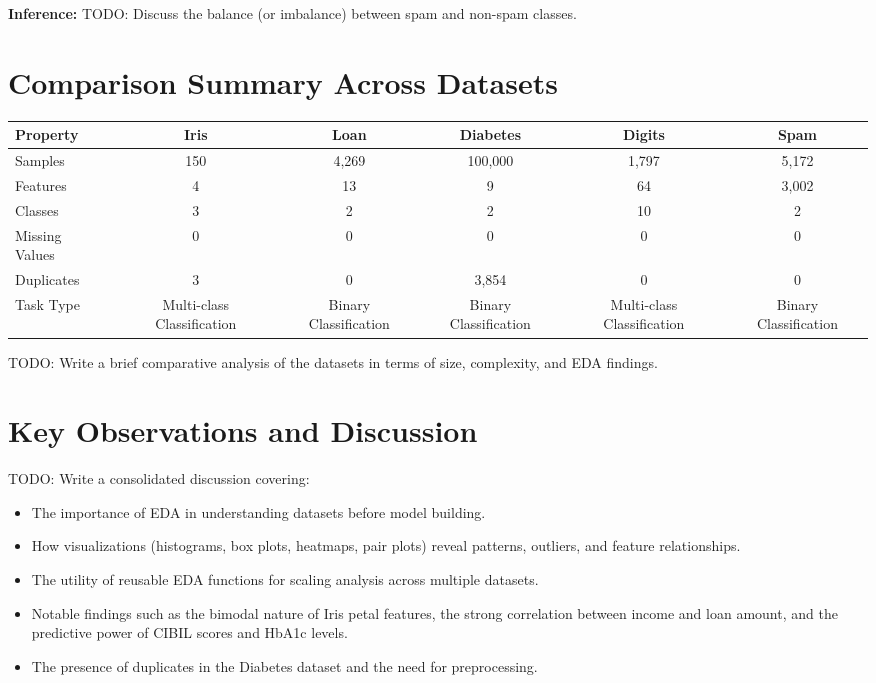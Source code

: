 \documentclass[12pt,a4paper]{article}
\begin{document}
\textbf{Inference:}
TODO: Discuss the balance (or imbalance) between spam and non-spam classes.

\section{Comparison Summary Across Datasets}

\begin{longtable}{|p{3.5cm}|c|c|c|c|c|}
\hline
\textbf{Property} & \textbf{Iris} & \textbf{Loan} & \textbf{Diabetes} & \textbf{Digits} & \textbf{Spam} \\ \hline
Samples & 150 & 4,269 & 100,000 & 1,797 & 5,172 \\ \hline
Features & 4 & 13 & 9 & 64 & 3,002 \\ \hline
Classes & 3 & 2 & 2 & 10 & 2 \\ \hline
Missing Values & 0 & 0 & 0 & 0 & 0 \\ \hline
Duplicates & 3 & 0 & 3,854 & 0 & 0 \\ \hline
Task Type & Multi-class Classification & Binary Classification & Binary Classification & Multi-class Classification & Binary Classification \\ \hline
\end{longtable}

TODO: Write a brief comparative analysis of the datasets in terms of size, complexity, and EDA findings.

\section{Key Observations and Discussion}
TODO: Write a consolidated discussion covering:

\begin{itemize}
    \item The importance of EDA in understanding datasets before model building.
    \item How visualizations (histograms, box plots, heatmaps, pair plots) reveal patterns, outliers, and feature relationships.
    \item The utility of reusable EDA functions for scaling analysis across multiple datasets.
    \item Notable findings such as the bimodal nature of Iris petal features, the strong correlation between income and loan amount, and the predictive power of CIBIL scores and HbA1c levels.
    \item The presence of duplicates in the Diabetes dataset and the need for preprocessing.
\end{itemize}
\end{document}
